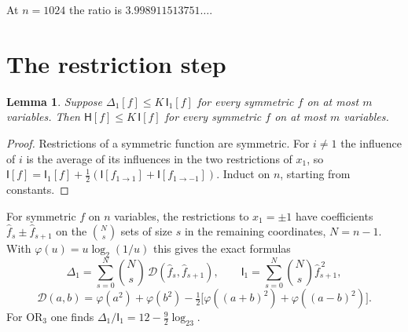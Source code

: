 \documentclass[11pt]{amsart}
\newtheorem{lemma}[theorem]{Lemma}
\theoremstyle{definition}
\theoremstyle{remark}
\newcommand{\HH}{\mathsf H}
\newcommand{\I}{\mathsf I}
\newcommand{\wh}[1]{\widehat{#1}}
\begin{document}
At $n=1024$ the ratio is $3.998911513751\ldots$.

\section{The restriction step}\label{sec:restriction}

\begin{lemma}\label{lem:induction}
Suppose $\Delta_1[f]\le K\,\I_1[f]$ for every symmetric $f$ on at most $m$ variables. Then $\HH[f]\le K\,\I[f]$ for every symmetric $f$ on at most $m$ variables.
\end{lemma}

\begin{proof}
Restrictions of a symmetric function are symmetric. For $i\ne1$ the influence of $i$ is the average of its influences in the two restrictions of $x_1$, so $\I[f]=\I_1[f]+\frac12(\I[f_{1\to1}]+\I[f_{1\to-1}])$. Induct on $n$, starting from constants.
\end{proof}

For symmetric $f$ on $n$ variables, the restrictions to $x_1=\pm1$ have coefficients $\wh f_s\pm\wh f_{s+1}$ on the $\binom Ns$ sets of size $s$ in the remaining coordinates, $N=n-1$. With $\varphi(u)=u\log_2(1/u)$ this gives the exact formulas
\begin{equation}\label{eq:delta}
 \Delta_1=\sum_{s=0}^{N}\binom Ns\,\mathcal D(\wh f_s,\wh f_{s+1}),\qquad \I_1=\sum_{s=0}^N\binom Ns\wh f_{s+1}^{\,2},
\end{equation}
\[
 \mathcal D(a,b)=\varphi(a^2)+\varphi(b^2)-\tfrac12\bigl[\varphi((a+b)^2)+\varphi((a-b)^2)\bigr].
\]
For $\mathrm{OR}_3$ one finds $\Delta_1/\I_1=12-\frac92\log_23$.
\end{document}

